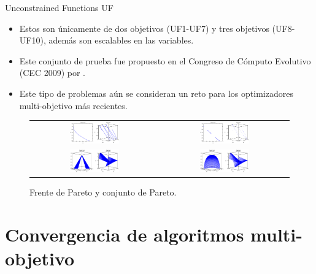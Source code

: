 \documentclass{beamer}
\begin{document}
\begin{frame}{Unconstrained Functions UF}
\begin{itemize}
\scriptsize
   \item Estos son únicamente de dos objetivos (UF1-UF7) y tres objetivos (UF8-UF10), además son escalables en las variables.
   \item Este conjunto de prueba fue propuesto en el Congreso de Cómputo Evolutivo (CEC 2009) por \citeauthor{Joel:CEC2009}.
   \item Este tipo de problemas aún se consideran un reto para los optimizadores multi-objetivo más recientes.
\end{itemize}
\begin{figure}[H]
\begin{tabular}{c c}
\includegraphics[width=0.4\textwidth]{Images/UF1.eps}     &  \includegraphics[width=0.4\textwidth]{Images/UF6.eps} \\
\includegraphics[width=0.4\textwidth]{Images/UF9.eps}     &  \includegraphics[width=0.4\textwidth]{Images/UF10.eps} \\
\end{tabular}
\centering
\caption{\scriptsize Frente de Pareto y conjunto de Pareto.}
\end{figure}

\end{frame}


\section{Convergencia de algoritmos multi-objetivo}
\end{document}
